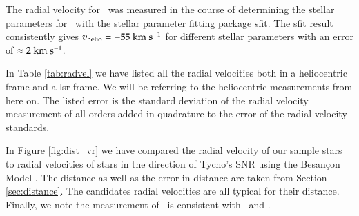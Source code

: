 The radial velocity for \starb\ was measured in the course of determining the stellar parameters for \starb\ with the stellar parameter fitting package \gls{sfit}. The \gls{sfit} result consistently gives $v_\textrm{helio} = -55~\textrm{km}~\textrm{s}^{-1}$ for different stellar parameters with an error of $\approx 2~\textrm{km}~\textrm{s}^{-1}$. 


In Table \ref{tab:radvel} we have listed all the radial velocities both in a heliocentric frame and a \gls{lsr} frame. We will be referring to the heliocentric measurements from here on. The listed error is the standard deviation of the radial velocity measurement of all orders added in quadrature to the error of the radial velocity standards.

In Figure \ref{fig:dist_vr} we have compared the radial velocity of our sample stars to radial velocities of stars in the direction of Tycho's SNR using the Besan\c{c}on Model \citep{2003A&A...409..523R}. The distance as well as the error in distance are taken from Section \ref{sec:distance}.  The candidates radial velocities are all typical for their distance. Finally, we note the measurement of \starg\ is consistent with \wek\ and \gh.


